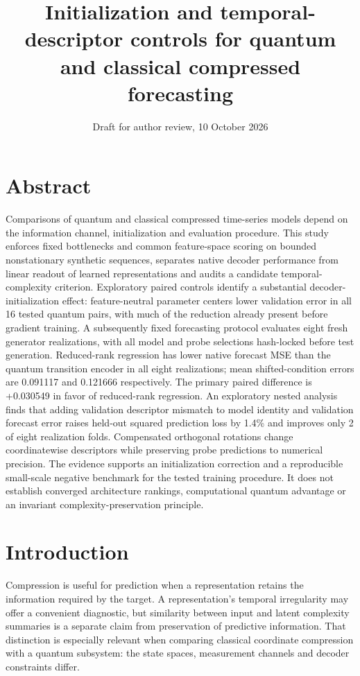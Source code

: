 \documentclass[
  11pt,
]{article}
\title{Initialization and temporal-descriptor controls for quantum and
classical compressed forecasting}
\author{}
\date{Draft for author review, 10 October 2026}
\begin{document}
\maketitle

\hypertarget{abstract}{%
\section*{Abstract}\label{abstract}}

Comparisons of quantum and classical compressed time-series models
depend on the information channel, initialization and evaluation
procedure. This study enforces fixed bottlenecks and common
feature-space scoring on bounded nonstationary synthetic sequences,
separates native decoder performance from linear readout of learned
representations and audits a candidate temporal-complexity criterion.
Exploratory paired controls identify a substantial
decoder-initialization effect: feature-neutral parameter centers lower
validation error in all 16 tested quantum pairs, with much of the
reduction already present before gradient training. A subsequently fixed
forecasting protocol evaluates eight fresh generator realizations, with
all model and probe selections hash-locked before test generation.
Reduced-rank regression has lower native forecast MSE than the quantum
transition encoder in all eight realizations; mean shifted-condition
errors are 0.091117 and 0.121666 respectively. The primary paired
difference is +0.030549 in favor of reduced-rank regression. An
exploratory nested analysis finds that adding validation descriptor
mismatch to model identity and validation forecast error raises held-out
squared prediction loss by 1.4\% and improves only 2 of eight
realization folds. Compensated orthogonal rotations change
coordinatewise descriptors while preserving probe predictions to
numerical precision. The evidence supports an initialization correction
and a reproducible small-scale negative benchmark for the tested
training procedure. It does not establish converged architecture
rankings, computational quantum advantage or an invariant
complexity-preservation principle.

\hypertarget{introduction}{%
\section{Introduction}\label{introduction}}

Compression is useful for prediction when a representation retains the
information required by the target. A representation's temporal
irregularity may offer a convenient diagnostic, but similarity between
input and latent complexity summaries is a separate claim from
preservation of predictive information. That distinction is especially
relevant when comparing classical coordinate compression with a quantum
subsystem: the state spaces, measurement channels and decoder
constraints differ.
\end{document}

